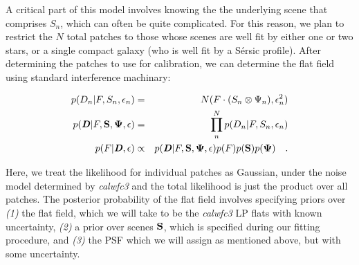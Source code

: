 \documentclass[12pt]{article}
\newcommand{\bvec}[1]{\textbf{\textit{#1}}}
\begin{document}
A critical part of this model involves knowing the the underlying
scene that comprises $S_n$, which can often be quite complicated.  For
this reason, we plan to restrict the $N$ total patches to those whose
scenes are well fit by either one or two stars, or a single compact
galaxy (who is well fit by a S\'{e}rsic profile).  After determining
the patches to use for calibration, we can determine the flat field
using standard interference machinary:

\begin{eqnarray}
p(D_n|F,S_n,\epsilon_n) &=& N(F \cdot (S_n \otimes \Psi_n), \epsilon_n^2)
\\
p(\bvec{D}|F,{\bf S},{\bf \Psi},{\bf \epsilon}) &=& \prod_n^N
p(D_n|F,S_n,\epsilon_n) \\
p(F|\bvec{D},{\bf \epsilon}) & \propto & p(\bvec{D}|F,{\bf S},{\bf \Psi},{\bf
  \epsilon}) p(F) p({\bf S}) p({\bf \Psi})
\quad .
\end{eqnarray}

Here, we treat the likelihood for individual patches as Gaussian, under the
noise model determined by \textsl{calwfc3} and the total likelihood is
just the product over all patches. The posterior probability of the
flat field involves specifying priors over \textsl{(1)} the flat
field, which we will take to be the \textsl{calwfc3} LP flats with
known uncertainty, \textsl{(2)} a prior over scenes ${\bf S}$, which
is specified during our fitting procedure, and \textsl{(3)} the PSF
which we will assign as mentioned above, but with some uncertainty.
\end{document}
